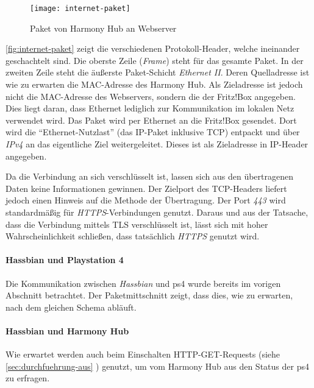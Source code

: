 \begin{figure}[h!]
    \centering
    \texttt{[image: internet-paket]}
    \caption{Paket von Harmony Hub an Webserver}\label{fig:internet-paket}
\end{figure}


\autoref{fig:internet-paket} zeigt die verschiedenen Protokoll-Header, welche ineinander geschachtelt sind.
Die oberste Zeile (\textit{Frame}) steht für das gesamte Paket.
In der zweiten Zeile steht die äußerste Paket-Schicht \textit{Ethernet II}.
Deren Quelladresse ist wie zu erwarten die MAC-Adresse des Harmony Hub.
Als Zieladresse ist jedoch nicht die MAC-Adresse des Webservers,
sondern die der Fritz!Box angegeben. Dies liegt daran, dass Ethernet lediglich zur Kommunikation im lokalen Netz verwendet wird.
Das Paket wird per Ethernet an die Fritz!Box gesendet.
Dort wird die \enquote{Ethernet-Nutzlast} (das IP-Paket inklusive TCP) entpackt und über \textit{IPv4} an das eigentliche Ziel weitergeleitet.
Dieses ist als Zieladresse in IP-Header angegeben.

Da die Verbindung an sich verschlüsselt ist, lassen sich aus den übertragenen Daten keine Informationen gewinnen.
Der Zielport des TCP-Headers liefert jedoch einen Hinweis auf die Methode der Übertragung.
Der Port \textit{443} wird standardmäßig für \textit{HTTPS}-Verbindungen genutzt.
Daraus und aus der Tatsache, dass die Verbindung mittels TLS verschlüsselt ist,
lässt sich mit hoher Wahrscheinlichkeit schließen, dass tatsächlich \textit{HTTPS} genutzt wird.


\paragraph{Hassbian und Playstation 4}
Die Kommunikation zwischen \textit{Hassbian} und \ac{ps4} wurde bereits im vorigen Abschnitt betrachtet.
Der Paketmittschnitt zeigt, dass dies, wie zu erwarten, nach dem gleichen Schema abläuft.

\paragraph{Hassbian und Harmony Hub}
Wie erwartet werden auch beim Einschalten HTTP-GET-Requests (siehe \ref{sec:durchfuehrung-aus} \textit{}) genutzt,
um vom Harmony Hub aus den Status der \ac{ps4} zu erfragen.

